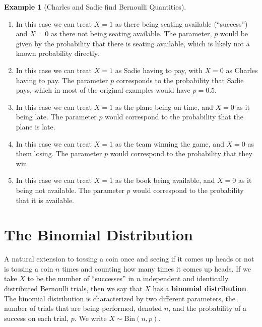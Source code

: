 \documentclass[
  letterpaper,
  DIV=11,
  numbers=noendperiod]{scrreprt}
\providecommand{\tightlist}{%
  \setlength{\itemsep}{0pt}\setlength{\parskip}{0pt}}\usepackage{longtable,booktabs,array}
\theoremstyle{definition}
\theoremstyle{definition}
\newtheorem{example}{Example}[chapter]
\theoremstyle{definition}
\theoremstyle{remark}
\begin{document}
\begin{example}[Charles and Sadie find Bernoulli
Quantities]
\begin{tcolorbox}[enhanced jigsaw, colback=white, colframe=quarto-callout-color-frame, arc=.35mm, leftrule=.75mm, rightrule=.15mm, opacityback=0, breakable, bottomrule=.15mm, left=2mm, toprule=.15mm]
\begin{enumerate}
\def\labelenumi{\alph{enumi}.}
\tightlist
\item
  In this case we can treat \(X=1\) as there being seating available
  (``success'') and \(X=0\) as there not being seating available. The
  parameter, \(p\) would be given by the probability that there is
  seating available, which is likely not a known probability directly.
\item
  In this case we can treat \(X=1\) as Sadie having to pay, with \(X=0\)
  as Charles having to pay. The parameter \(p\) corresponds to the
  probability that Sadie pays, which in most of the original examples
  would have \(p=0.5\).
\item
  In this case we can treat \(X=1\) as the plane being on time, and
  \(X=0\) as it being late. The parameter \(p\) would correspond to the
  probability that the plane is late.
\item
  In this case we can treat \(X=1\) as the team winning the game, and
  \(X=0\) as them losing. The parameter \(p\) would correspond to the
  probability that they win.
\item
  In this case we can treat \(X=1\) as the book being available, and
  \(X=0\) as it being not available. The parameter \(p\) would
  correspond to the probability that it is available.
\end{enumerate}

\end{tcolorbox}

\end{example}

\section{The Binomial Distribution}\label{the-binomial-distribution}

A natural extension to tossing a coin once and seeing if it comes up
heads or not is tossing a coin \(n\) times and counting how many times
it comes up heads. If we take \(X\) to be the number of ``successes'' in
\(n\) independent and identically distributed Bernoulli trials, then we
say that \(X\) has a \textbf{binomial distribution}. The binomial
distribution is characterized by two different parameters, the number of
trials that are being performed, denoted \(n\), and the probability of a
success on each trial, \(p\). We write \(X\sim\text{Bin}(n,p)\).
\end{document}
